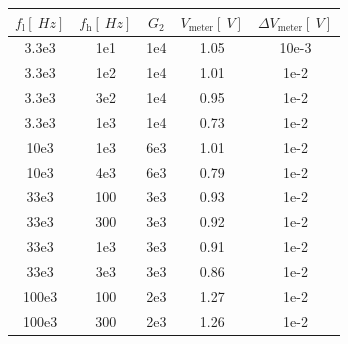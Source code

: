 \documentclass[sn-mathphys-num,iicol]{sn-jnl}
\theoremstyle{thmstyleone}
\theoremstyle{thmstyletwo}
\theoremstyle{thmstylethree}
\begin{document}
\begin{table}[h]
	\begin{tabular}{S[table-format=3.1e1] S[table-format=3e1] S[table-format=1e1] S[table-format=1.2] S[table-format=2e1]}
		\toprule
		$f_\text{l}[\SI{}{Hz}]$ & $f_\text{h}[\SI{}{Hz}]$ & $G_{2}$ & $V_\text{meter}\left[\SI{}{V}\right]$ & $\Delta V_\text{meter}\left[\SI{}{V}\right]$ \\
		\midrule
		3.3e3                   & 1e1                     & 1e4     & 1.05                                  & 10e-3                                        \\
		3.3e3                   & 1e2                     & 1e4     & 1.01                                  & 1e-2                                         \\
		3.3e3                   & 3e2                     & 1e4     & 0.95                                  & 1e-2                                         \\
		3.3e3                   & 1e3                     & 1e4     & 0.73                                  & 1e-2                                         \\
		10e3                    & 1e3                     & 6e3     & 1.01                                  & 1e-2                                         \\
		10e3                    & 4e3                     & 6e3     & 0.79                                  & 1e-2                                         \\
		33e3                    & 100                     & 3e3     & 0.93                                  & 1e-2                                         \\
		33e3                    & 300                     & 3e3     & 0.92                                  & 1e-2                                         \\
		33e3                    & 1e3                     & 3e3     & 0.91                                  & 1e-2                                         \\
		33e3                    & 3e3                     & 3e3     & 0.86                                  & 1e-2                                         \\
		100e3                   & 100                     & 2e3     & 1.27                                  & 1e-2                                         \\
		100e3                   & 300                     & 2e3     & 1.26                                  & 1e-2                                         \\

\end{tabular}
\end{table}
\end{document}
